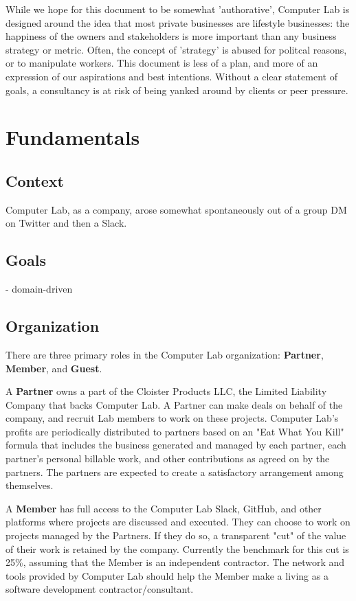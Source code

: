 \documentclass[12pt]{article}
\begin{document}
While we hope for this document to be somewhat 'authorative', Computer Lab is
designed around the idea that most private businesses are lifestyle businesses:
the happiness of the owners and stakeholders is more important than any business
strategy or metric.  Often, the concept of 'strategy' is abused for politcal
reasons, or to manipulate workers.  This document is less of a plan, and more of
an expression of our aspirations and best intentions.  Without a clear statement
of goals, a consultancy is at risk of being yanked around by clients or peer
pressure.

\section{Fundamentals}
\subsection{Context}

Computer Lab, as a company, arose somewhat spontaneously out of a group DM on
Twitter and then a Slack.

\subsection{Goals}

- domain-driven


\subsection{Organization}

There are three primary roles in the Computer Lab organization: \textbf{Partner},
\textbf{Member}, and \textbf{Guest}.

A \textbf{Partner} owns a part of the Cloister Products LLC, the Limited Liability
Company that backs Computer Lab.  A Partner can make deals on behalf of the
company, and recruit Lab members to work on these projects.  Computer Lab's
profits are periodically distributed to partners based on an "Eat What You Kill"
formula that includes the business generated and managed by each partner, each
partner's personal billable work, and other contributions as agreed on by the
partners.  The partners are expected to create a satisfactory arrangement among
themselves.

A \textbf{Member} has full access to the Computer Lab Slack, GitHub, and other
platforms where projects are discussed and executed.  They can choose to work on
projects managed by the Partners.  If they do so, a transparent "cut" of the
value of their work is retained by the company.  Currently the benchmark for
this cut is 25\%, assuming that the Member is an independent contractor.  The
network and tools provided by Computer Lab should help the Member make a living
as a software development contractor/consultant.
\end{document}
